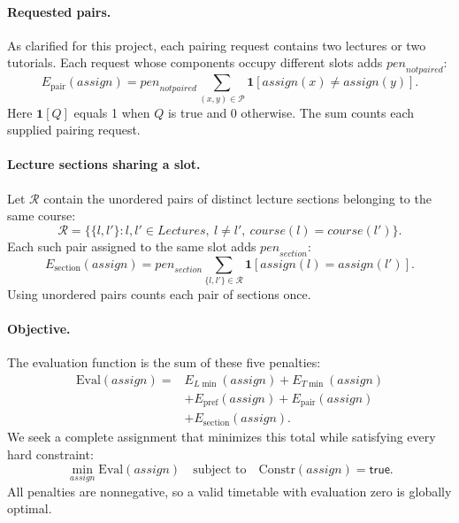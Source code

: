 \paragraph{Requested pairs.}
As clarified for this project, each pairing request
contains two lectures or two tutorials. Each request
whose components occupy different slots adds
$\mathit{pen}_{\mathit{notpaired}}$:
\begin{equation}
E_{\mathrm{pair}}(\mathit{assign})
=\mathit{pen}_{\mathit{notpaired}}
 \sum_{(x,y)\in\mathcal P}
 \mathbf{1}[\mathit{assign}(x)\neq\mathit{assign}(y)].
\label{eq:epair}
\end{equation}
Here $\mathbf{1}[Q]$ equals 1 when $Q$ is true and 0
otherwise. The sum counts each supplied pairing request.

\paragraph{Lecture sections sharing a slot.}
Let $\mathcal R$ contain the unordered pairs of distinct
lecture sections belonging to the same course:
\[
\mathcal R=
\{\{l,l'\}:l,l'\in\mathit{Lectures},\
l\neq l',\
\mathit{course}(l)=\mathit{course}(l')\}.
\]
Each such pair assigned to the same slot adds
$\mathit{pen}_{\mathit{section}}$:
\begin{equation}
E_{\mathrm{section}}(\mathit{assign})
=\mathit{pen}_{\mathit{section}}
 \sum_{\{l,l'\}\in\mathcal R}
 \mathbf{1}[\mathit{assign}(l)=\mathit{assign}(l')].
\label{eq:esection}
\end{equation}
Using unordered pairs counts each pair of sections once.

\paragraph{Objective.}
The evaluation function is the sum of these five penalties:
\begin{equation}
\begin{aligned}
\mathrm{Eval}(\mathit{assign})={}&
 E_{L\min}(\mathit{assign})
 +E_{T\min}(\mathit{assign})\\
&+E_{\mathrm{pref}}(\mathit{assign})
 +E_{\mathrm{pair}}(\mathit{assign})\\
&+E_{\mathrm{section}}(\mathit{assign}).
\end{aligned}
\label{eq:eval}
\end{equation}
We seek a complete assignment that minimizes this total
while satisfying every hard constraint:
\[
\min_{\mathit{assign}}\mathrm{Eval}(\mathit{assign})
\quad\text{subject to}\quad
\mathrm{Constr}(\mathit{assign})=\mathsf{true}.
\]
All penalties are nonnegative, so a valid timetable with
evaluation zero is globally optimal.